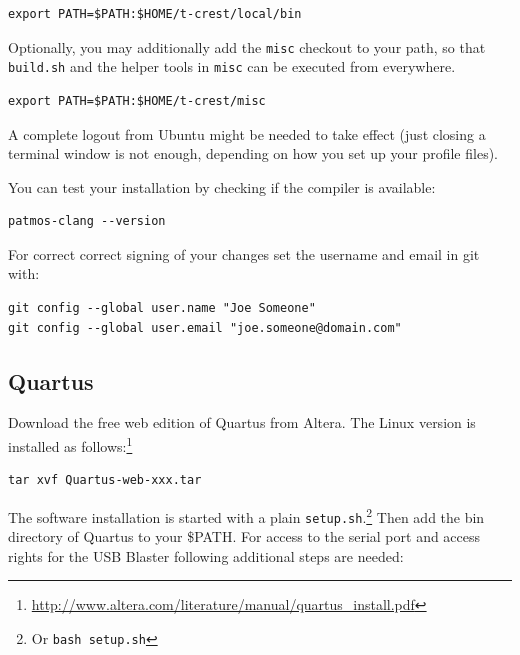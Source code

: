 \documentclass[a4paper,fontsize=10pt,twoside,DIV15,BCOR12mm,headinclude=true,footinclude=false,pagesize,bibtotoc]{scrbook}
\newcommand{\code}[1]{{\texttt{#1}}}
\newcommand{\comment}[3]{

\textsf{\textbf{#1}} {\color{#3}#2}}
\newcommand{\stefan}[1]{\comment{Stefan}{#1}{RoyalPurple}}
\renewcommand{\stefan}[1]{}
\begin{document}
\stefan{Relative paths should actually work, but the \textasciitilde{} shortcut is shell-specific and may not work, but
not sure about this.}

\begin{verbatim}
export PATH=$PATH:$HOME/t-crest/local/bin
\end{verbatim}

Optionally, you may additionally add the \code{misc} checkout to your path, so that \code{build.sh} and the helper tools in 
\code{misc} can be executed from everywhere.

\begin{verbatim}
export PATH=$PATH:$HOME/t-crest/misc
\end{verbatim}

A complete logout from Ubuntu might be needed to take effect (just closing
a terminal window is not enough, depending on how you set up your profile files).

\stefan{Only if you do it wrong ;) }

You can test your installation by checking if the compiler is available:

\begin{verbatim}
patmos-clang --version
\end{verbatim}

For correct correct signing of your changes set the username and
email in git with:

\begin{verbatim}
git config --global user.name "Joe Someone"
git config --global user.email "joe.someone@domain.com"
\end{verbatim}

\subsection{Quartus}

Download the free web edition of Quartus from Altera. The Linux version is
installed as follows:\footnote{\url{http://www.altera.com/literature/manual/quartus_install.pdf}}

\begin{verbatim}
tar xvf Quartus-web-xxx.tar
\end{verbatim}

The software installation is started with a plain \code{setup.sh}.\footnote{Or \code{bash setup.sh}}
Then add the bin directory of Quartus to your \$PATH.
%
For access to the serial port and access rights for the USB Blaster following additional steps are needed:
\end{document}
